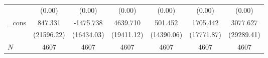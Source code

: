 {\begin{tabular}{l*{6}{c}}
            &                   (0.00)         &                   (0.00)         &                   (0.00)         &                   (0.00)         &                   (0.00)         &                   (0.00)         \\
\_cons      &                  847.331         &                -1475.738         &                 4639.710         &                  501.452         &                 1705.442         &                 3077.627         \\
            &               (21596.22)         &               (16434.03)         &               (19411.12)         &               (14390.06)         &               (17771.87)         &               (29289.41)         \\
\hline
\(N\)       &                     4607         &                     4607         &                     4607         &                     4607         &                     4607         &                     4607         \\
\hline\hline
\end{tabular}
}
